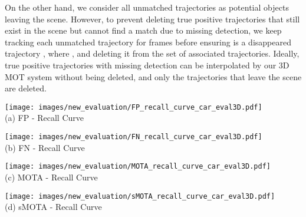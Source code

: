 \documentclass[letterpaper, 10 pt, conference]{ieeeconf}
\begin{document}
On the other hand, we consider all unmatched trajectories  as potential objects leaving the scene. However, to prevent deleting true positive trajectories that still exist in the scene but cannot find a match due to missing detection, we keep tracking each unmatched trajectory  for  frames before ensuring  is a disappeared trajectory , where , and deleting it from the set of associated trajectories. Ideally, true positive trajectories with missing detection can be interpolated by our 3D MOT system without being deleted, and only the trajectories that leave the scene are deleted.

\begin{figure*}
\begin{center}
\begin{minipage}[c]{0.245\textwidth}
    \begin{center}
    \texttt{[image: images/new\_evaluation/FP\_recall\_curve\_car\_eval3D.pdf]}
    \vspace{-0.7cm}
    \\ (a) FP - Recall Curve
    \label{fig:fp_recall} 
    \end{center}
\end{minipage}
\begin{minipage}[c]{0.245\textwidth}
    \begin{center}
    \texttt{[image: images/new\_evaluation/FN\_recall\_curve\_car\_eval3D.pdf]}
    \vspace{-0.7cm}
    \\ (b) FN - Recall Curve
    \label{fig:fn_recall} 
    \end{center}
\end{minipage}
\begin{minipage}[c]{0.245\textwidth}
    \begin{center}
    \centering
    \texttt{[image: images/new\_evaluation/MOTA\_recall\_curve\_car\_eval3D.pdf]}
    \vspace{-0.7cm}
    \\ (c) MOTA - Recall Curve
    \label{fig:mota_recall} 
    \end{center}
\end{minipage}
\begin{minipage}[c]{0.2455\textwidth}
    \begin{center}
\texttt{[image: images/new\_evaluation/sMOTA\_recall\_curve\_car\_eval3D.pdf]}
    \vspace{-0.7cm}
    \\ (d) sMOTA - Recall Curve

\end{center}
\end{minipage}
\end{center}
\end{figure*}
\end{document}
